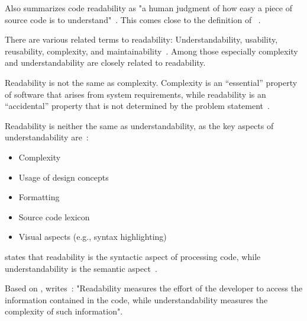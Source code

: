 \documentclass[%
class=scrreprt,
chapterprefix=false,%
open=right,%
twoside=false,%
paper=a4,%
logofile={Logo\_zentral\_farbig\_EN.png},%
thesistype=master,%
UKenglish,%
]{se2thesis}
\theoremstyle{definition}
\begin{document}
	Also \citeauthor{mi2021effectiveness} summarizes code readability as "a human judgment of how easy a piece of
	source code is to understand"~\cite{mi2021effectiveness}. This comes close to the definition of \citeauthor{buse2009learning}~\cite{buse2009learning}.
	
	There are various related terms to readability: Understandability, usability, reusability, complexity, and maintainability~\cite{tashtoush2013impact}. Among those especially complexity and understandability are closely related to readability.
	
	Readability is not the same as complexity. Complexity is an “essential” property of software that arises
	from system requirements, while readability is an “accidental” property that is not determined by the problem statement~\cite{buse2009learning, brooks1987no}.
	
	Readability is neither the same as understandability, as the key aspects of understandability are~\cite{scalabrino2018comprehensive, martin2009clean, wilson2007beautiful, beck2007implementation}:
	\begin{itemize}
		\item Complexity
		\item Usage of design concepts
		\item Formatting
		\item Source code lexicon
		\item Visual aspects (e.g., syntax highlighting)
	\end{itemize}
	
	\citeauthor{posnett2011simpler} states that readability is the syntactic aspect of processing code, while understandability is the semantic aspect~\cite{posnett2011simpler}.
	
	Based on \citeauthor{posnett2011simpler}, \citeauthor{scalabrino2018comprehensive} writes~\cite{scalabrino2018comprehensive}: "Readability measures the effort of the developer to access the information contained in the code, while understandability measures the complexity of such information".
	
	
\end{document}
